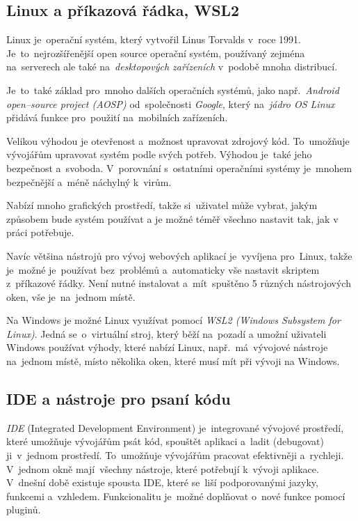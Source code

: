 \documentclass[14pt,a4paper]{article}
\begin{document}
        \subsection{Linux a příkazová řádka, WSL2}
        Linux je~operační systém, který vytvořil Linus Torvalds v~roce 1991. Je~to~nejrozšířenější open source operační systém, používaný zejména na~serverech ale také na~\emph{desktopových zařízeních} v~podobě mnoha distribucí.
        
        Je~to~také základ pro~mnoho dalších operačních systémů, jako např.~\emph{Android open--source project (\emph{AOSP})} od~společnosti \emph{Google}, který na~\emph{jádro OS Linux} přidává funkce pro~použití na~mobilních zařízeních. \cite{AOSP:linux}
        
        Velikou výhodou je otevřenost a~možnost upravovat zdrojový kód. To~umožňuje vývojářům upravovat systém podle svých potřeb. Výhodou je~také jeho bezpečnost a~svoboda. V~porovnání s~ostatními operačními systémy je~mnohem bezpečnější a~méně náchylný k~virům. \cite{medium:LinuxSecure}

        Nabízí mnoho grafických prostředí, takže si~uživatel může vybrat, jakým způsobem bude systém používat a je možné téměř
        všechno nastavit tak, jak v práci potřebuje.

        Navíc většina nástrojů pro vývoj webových aplikací je~vyvíjena pro~Linux, takže je~možné je~používat bez~problémů a~automaticky vše nastavit skriptem z~příkazové řádky. Není nutné instalovat a~mít~spuštěno 5 různých nástrojových oken, vše je~na~jednom místě.

        Na Windows je možné Linux využívat pomocí \emph{WSL2 (Windows Subsystem for Linux)}. Jedná se~o~virtuální stroj, který běží na~pozadí a umožní uživateli Windows používat výhody, které nabízí Linux, např.~má~vývojové nástroje na~jednom místě, místo několika oken, které musí mít při vývoji na Windows.

        \subsection{IDE a nástroje pro psaní kódu}
        \emph{IDE} (Integrated Development Environment) je~integrované vývojové prostředí, které umožňuje vývojářům psát kód, spouštět aplikaci a~ladit (debugovat) ji~v~jednom prostředí. To~umožňuje vývojářům pracovat efektivněji a~rychleji. V~jednom okně mají~všechny nástroje, které potřebují k~vývoji aplikace. V~dnešní době existuje spousta IDE, které se~liší podporovanými jazyky, funkcemi a~vzhledem. Funkcionalitu je~možné doplňovat o~nové funkce pomocí pluginů.
        
\end{document}
